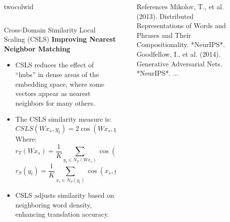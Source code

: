 \documentclass[final]{beamer}
\newlength{\sepwid}
\newlength{\onecolwid}
\newlength{\twocolwid}
\begin{document}
\begin{frame}[t]
\begin{columns}[t]
\begin{column}{twocolwid}
\begin{columns}[t,totalwidth=\twocolwid]
\begin{column}{\onecolwid}
\end{column} 

\end{columns} 


\begin{block}{Cross-Domain Similarity Local Scaling (CSLS)}
    \textbf{Improving Nearest Neighbor Matching}
    \begin{itemize}
        \item CSLS reduces the effect of “hubs” in dense areas of the embedding space, where some vectors appear as nearest neighbors for many others.
        \item The CSLS similarity measure is:
        \begin{equation}
            CSLS(W x_s, y_t) = 2 \cos(W x_s, y_t) - r_T(W x_s) - r_S(y_t)
        \end{equation}
        Where:
        \begin{equation}
            r_T(W x_s) = \frac{1}{K} \sum_{y_t \in N_T(W x_s)} \cos(W x_s, y_t)
        \end{equation}
        \begin{equation}
            r_S(y_t) = \frac{1}{K} \sum_{x_s \in N_S(y_t)} \cos(x_s, y_t)
        \end{equation}
        \item CSLS adjusts similarity based on neighboring word density, enhancing translation accuracy.
    \end{itemize}
\end{block}

\end{column} 

\begin{column}{\sepwid}\end{column} 

\begin{column}{\onecolwid} 


\begin{block}{References}
\small
Mikolov, T., et al. (2013). Distributed Representations of Words and Phrases and Their Compositionality. *NeurIPS*.\\
Goodfellow, I., et al. (2014). Generative Adversarial Nets. *NeurIPS*.
...
\end{block}


\end{column}

\begin{column}{\sepwid}\end{column}

\end{columns}
\end{frame}
\end{document}
